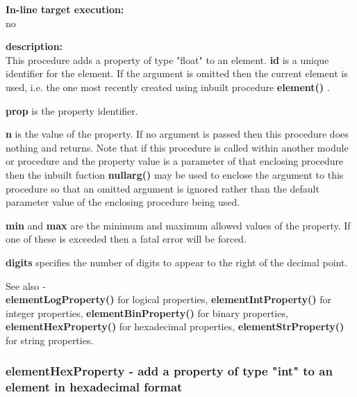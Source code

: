             {\bf In-line target execution:} \\
            no

            {\bf description:} \\
            This procedure adds a property of type "float" to an element.
            {\bf id} is a unique identifier for the element. If the argument is
            omitted then the current element is used, i.e. the one most recently
            created using inbuilt procedure {\bf element()} .
            
            {\bf prop} is the property identifier.
            
            {\bf n} is the value of the property. If no argument is passed then
            this procedure does nothing and returns. Note that if this procedure
            is called within another module or procedure and the property
            value is a parameter of that enclosing procedure then the inbuilt
            fuction {\bf nullarg()}  may be used to enclose the
            argument to this procedure so that an omitted argument is ignored rather
            than the default parameter value of the enclosing procedure being used.
            
            {\bf min} and {\bf max} are the minimum and maximum allowed values
            of the property. If one of these is exceeded then a fatal error
            will be forced.
            
            {\bf digits} specifies the number of digits to appear to the right
            of the decimal point.
            
            See also - \\
            {\bf elementLogProperty()}  for logical properties,
            {\bf elementIntProperty()}  for integer properties,
            {\bf elementBinProperty()}  for binary properties,
            {\bf elementHexProperty()}  for hexadecimal properties,
            {\bf elementStrProperty()}  for string properties.







        \subsubsection{elementHexProperty - add a property of type "int" to an element in hexadecimal format}\label{sec:lpelementHexProperty}
            
